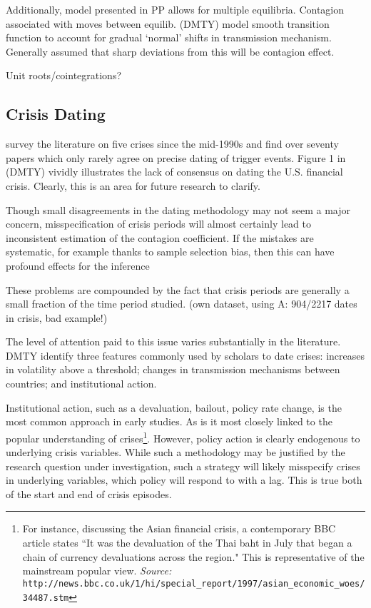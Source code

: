 \documentclass[../base.tex]{subfiles}
\begin{document}
Additionally, model presented in PP allows for multiple equilibria. Contagion associated with moves between equilib. \cite{dungey2015endogenous} (DMTY) model smooth transition function to account for gradual `normal' shifts in transmission mechanism. Generally assumed that sharp deviations from this will be contagion effect. 

Unit roots/cointegrations?


\subsection{Crisis Dating}
\label{dating_methodology}

\cite{fry2011actually} survey the literature on five crises since the mid-1990s and find over seventy papers which only rarely agree on precise dating of trigger events. Figure 1 in  \cite{dungey2015endogenous} (DMTY) vividly illustrates the lack of consensus on dating the U.S. financial crisis. Clearly, this is an area for future research to clarify.

Though small disagreements in the dating methodology may not seem a major concern, misspecification of crisis periods will almost certainly lead to inconsistent estimation of the contagion coefficient. If the mistakes are systematic, for example thanks to sample selection bias, then this can have profound effects for the inference 

These problems are compounded by the fact that crisis periods are generally a small fraction of the time period studied. (own dataset, using A: 904/2217 dates in crisis, bad example!)

The level of attention paid to this issue varies substantially in the literature. DMTY identify three  features commonly used by scholars to date crises: increases in volatility above a threshold; changes in transmission mechanisms between countries; and institutional action.

Institutional action, such as a devaluation, bailout, policy rate change, is the most common approach in early studies. As is it most closely linked to the popular understanding of crises\footnote{For instance, discussing the Asian financial crisis, a contemporary BBC article states ``It was the devaluation of the Thai baht in July that began a chain of currency devaluations across the region." This is representative of the mainstream popular view.
\textit{Source:} \texttt{http://news.bbc.co.uk/1/hi/special\_report/1997/asian\_economic\_woes/34487.stm}}. However, policy action is clearly endogenous to underlying crisis variables. While such a methodology may be justified by the research question under investigation, such a strategy will likely misspecify crises in underlying variables, which policy will respond to with a lag. This is true both of the start and end of crisis episodes. 
\end{document}
